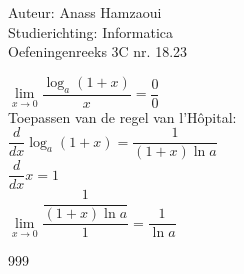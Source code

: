 \documentclass[a4paper]{article}
\begin{document}
  
\noindent \large Auteur: Anass Hamzaoui \\
\noindent \large Studierichting: Informatica \\
\noindent \large Oefeningenreeks 3C nr. 18.23 \\

\medskip

\normalsize

$\lim\limits_{x \to 0} \dfrac{\log_a (1 + x)}{x} = \dfrac{0}{0}$ \\

Toepassen van de regel van l'Hôpital: \\

$\dfrac{d}{dx} \log_a (1 + x) = \dfrac{1}{(1 + x) \ln a}$ \\

$\dfrac{d}{dx} x = 1$ \\

$\lim\limits_{x \to 0} \dfrac{\dfrac{1}{(1 + x) \ln a}}{1} = \dfrac{1}{\ln a}$ \\


\begin{thebibliography}{999}
\end{thebibliography}
\end{document}
